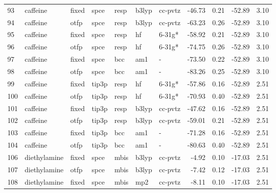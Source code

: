 \begin{tabular}{lllllllrrrr}
93  &                      caffeine &  fixed &   spce &   resp &   b3lyp &      cc-pvtz &      -46.73 &     0.21 &      -52.89 &      3.10 \\
94  &                      caffeine &   otfp &   spce &   resp &   b3lyp &      cc-pvtz &      -63.23 &     0.26 &      -52.89 &      3.10 \\
95  &                      caffeine &  fixed &   spce &   resp &      hf &       6-31g* &      -58.92 &     0.21 &      -52.89 &      3.10 \\
96  &                      caffeine &   otfp &   spce &   resp &      hf &       6-31g* &      -74.75 &     0.26 &      -52.89 &      3.10 \\
97  &                      caffeine &  fixed &   spce &    bcc &     am1 &            - &      -73.50 &     0.22 &      -52.89 &      3.10 \\
98  &                      caffeine &   otfp &   spce &    bcc &     am1 &            - &      -83.26 &     0.25 &      -52.89 &      3.10 \\
99  &                      caffeine &  fixed &  tip3p &   resp &      hf &       6-31g* &      -57.86 &     0.16 &      -52.89 &      2.51 \\
100 &                      caffeine &   otfp &  tip3p &   resp &      hf &       6-31g* &      -70.93 &     0.40 &      -52.89 &      2.51 \\
101 &                      caffeine &  fixed &  tip3p &   resp &   b3lyp &      cc-pvtz &      -47.62 &     0.16 &      -52.89 &      2.51 \\
102 &                      caffeine &   otfp &  tip3p &   resp &   b3lyp &      cc-pvtz &      -59.01 &     0.21 &      -52.89 &      2.51 \\
103 &                      caffeine &  fixed &  tip3p &    bcc &     am1 &            - &      -71.28 &     0.16 &      -52.89 &      2.51 \\
104 &                      caffeine &   otfp &  tip3p &    bcc &     am1 &            - &      -80.63 &     0.40 &      -52.89 &      2.51 \\
106 &                  diethylamine &  fixed &   spce &   mbis &   b3lyp &      cc-pvtz &       -4.92 &     0.10 &      -17.03 &      2.51 \\
107 &                  diethylamine &   otfp &   spce &   mbis &   b3lyp &      cc-pvtz &       -7.42 &     0.12 &      -17.03 &      2.51 \\
108 &                  diethylamine &  fixed &   spce &   mbis &     mp2 &      cc-pvtz &       -8.11 &     0.10 &      -17.03 &      2.51 \\

\end{tabular}
